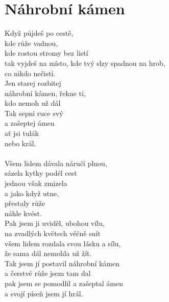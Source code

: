 \section{Náhrobní kámen}
\onehalfspacing

Když půjdeš po cestě, \\
kde růže vadnou, \\
kde rostou stromy bez listí\\

tak vyjdeš na místo, 
kde tvý slzy spadnou na hrob,\\
co nikdo nečistí.\\

Jen starej rozbitej\\
náhrobní kámen, řekne ti, \\
kdo nemoh už dál\\
Tak sepni ruce svý \\
a zašeptej ámen\\
ať jsi tulák \\
nebo král.\\


\textit{}\\

Všem lidem dávala náručí plnou,\\
 sázela kytky podél cest\\
jednou však zmizela \\
a jako když utne, \\
přestaly růže \\
náhle kvést.\\

\sloka
Pak jsem ji uviděl, ubohou vílu, \\
na zvadlých květech věčně snít\\
všem lidem rozdala svou lásku a sílu,\\
 že sama dál nemohla už žít.\\
Tak jsem jí postavil náhrobní kámen \\
a čerstvé růže jsem tam dal\\
pak jsem se pomodlil a zašeptal ámen \\
a svojí píseň jsem jí hrál. \\
